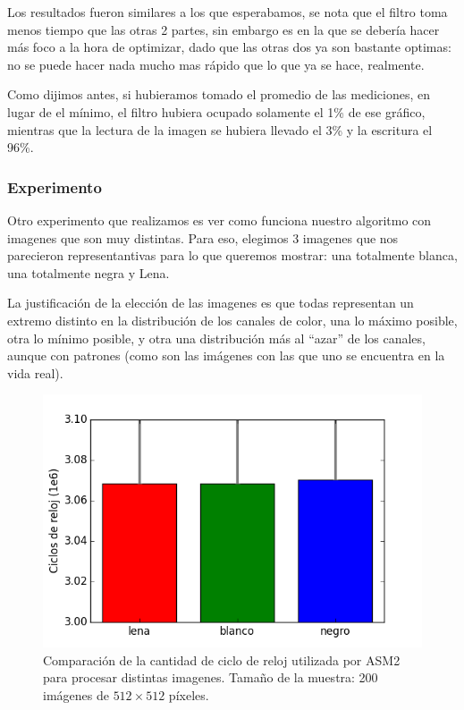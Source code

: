Los resultados fueron similares a los que esperabamos, se nota que el filtro toma menos tiempo que las otras 2 partes, sin embargo es en la que se debería hacer más foco a la hora de optimizar, dado que las otras dos ya son bastante optimas: no se puede hacer nada mucho mas rápido que lo que ya se hace, realmente.

Como dijimos antes, si hubieramos tomado el promedio de las mediciones, en lugar de el mínimo, el filtro hubiera ocupado solamente el 1\% de ese gráfico, mientras que la lectura de la imagen se hubiera llevado el 3\% y la escritura el 96\%.



\subsubsection*{Experimento}
Otro experimento que realizamos es ver como funciona nuestro algoritmo con imagenes que son muy distintas. Para eso, elegimos 3 imagenes que nos parecieron representantivas para lo que queremos mostrar: una totalmente blanca, una totalmente negra y Lena.

La justificación de la elección de las imagenes es que todas representan un extremo distinto en la distribución de los canales de color, una lo máximo posible, otra lo mínimo posible, y otra una distribución más al ``azar'' de los canales, aunque con patrones (como son las imágenes con las que uno se encuentra en la vida real).

\begin{figure}[H] 
	\centering
  \includegraphics[scale=0.7]{images/blur-imgs.png}
  \caption{Comparación de la cantidad de ciclo de reloj utilizada por ASM2 para procesar distintas imagenes. Tamaño de la muestra: 200 imágenes de $512 \times 512$ píxeles.}
\end{figure}


